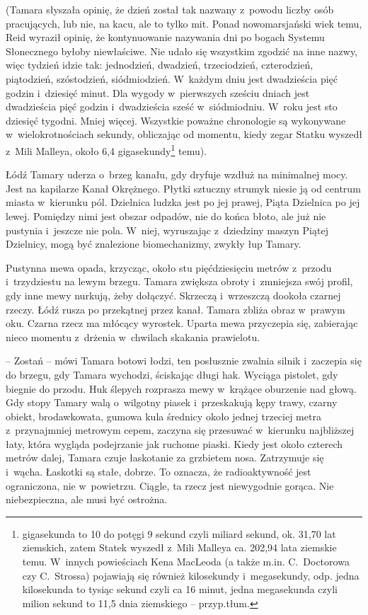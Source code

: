 \documentclass[oneside,polish,11pt,sfheadings]{mwbk}
\begin{document}
(Tamara słyszała opinię, że dzień został tak nazwany z~powodu liczby
osób pracujących, lub nie, na kacu, ale to tylko mit. Ponad
nowomarsjański wiek temu, Reid wyraził opinię, że kontynuowanie
nazywania dni po bogach Systemu Słonecznego byłoby niewłaściwe. Nie
udało się wszystkim zgodzić na inne nazwy, więc tydzień idzie tak:
jednodzień, dwadzień, trzeciodzień, czterodzień, piątodzień,
szóstodzień, siódmiodzień. W~każdym dniu jest dwadzieścia pięć godzin i~dziesięć minut. Dla wygody w~pierwszych sześciu dniach jest dwadzieścia
pięć godzin i~dwadzieścia sześć w~siódmiodniu. W~roku jest sto dziesięć
tygodni. Mniej więcej. Wszystkie poważne chronologie są wykonywane w~wielokrotnościach sekundy, obliczając od momentu, kiedy zegar Statku
wyszedł z~Mili Malleya, około 6,4 gigasekundy\footnote{gigasekunda to
10 do potęgi 9 sekund czyli miliard sekund, ok. 31,70 lat ziemskich, zatem Statek wyszedł z~Mili Malleya ca. 202,94 lata ziemskie temu. W~innych powieściach Kena
MacLeoda (a także m.in. C.~Doctorowa czy C.~Strossa) pojawiają się również kilosekundy i~megasekundy, odp. jedna
kilosekunda to tysiąc sekund czyli ca 16 minut, jedna megasekunda czyli milion sekund to 11,5 dnia ziemskiego -- przyp.tłum.} temu).

Łódź Tamary uderza o~brzeg kanału, gdy dryfuje wzdłuż na minimalnej
mocy. Jest na kapilarze Kanał Okrężnego. Płytki sztuczny strumyk niesie
ją od centrum miasta w~kierunku pól. Dzielnica ludzka jest po jej
prawej, Piąta Dzielnica po jej lewej. Pomiędzy nimi jest obszar odpadów,
nie do końca błoto, ale już nie pustynia i~jeszcze nie pola. W~niej,
wyruszając z~dziedziny maszyn Piątej Dzielnicy, mogą być znalezione
biomechanizmy, zwykły łup Tamary.

Pustynna mewa opada, krzycząc, około stu pięćdziesięciu metrów z~przodu i~trzydziestu na lewym brzegu. Tamara zwiększa obroty i~zmniejsza swój
profil, gdy inne mewy nurkują, żeby dołączyć. Skrzeczą i~wrzeszczą
dookoła czarnej rzeczy. Łódź rusza po przekątnej przez kanał. Tamara
zbliża obraz w~prawym oku. Czarna rzecz ma młócący wyrostek. Uparta mewa
przyczepia się, zabierając nieco momentu z~drżenia w~chwilach skakania
prawielotu.

-- Zostań -- mówi Tamara botowi łodzi, ten posłusznie zwalnia silnik i~zaczepia się do brzegu, gdy Tamara wychodzi, ściskając długi hak.
Wyciąga pistolet, gdy biegnie do przodu. Huk ślepych rozprasza mewy w~krążące oburzenie nad głową. Gdy stopy Tamary walą o~wilgotny piasek i~przeskakują kępy trawy, czarny obiekt, brodawkowata, gumowa kula
średnicy około jednej trzeciej metra z~przynajmniej metrowym cepem,
zaczyna się przesuwać w~kierunku najbliższej łaty, która wygląda
podejrzanie jak ruchome piaski. Kiedy jest około czterech metrów dalej,
Tamara czuje łaskotanie za grzbietem nosa. Zatrzymuje się i~wącha.
Łaskotki są stałe, dobrze. To oznacza, że radioaktywność jest
ograniczona, nie w~powietrzu. Ciągle, ta rzecz jest niewygodnie gorąca.
Nie niebezpieczna, ale musi być ostrożna.
\end{document}
